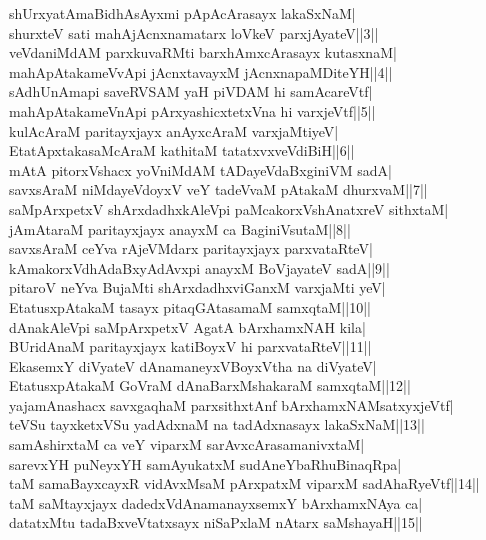 \documentclass{article}
\begin{document}
shUrxyatAmaBidhAsAyxmi pApAcArasayx lakaSxNaM|\\
shurxteV sati mahAjAcnxnamatarx loVkeV parxjAyateV||3||\\
veVdaniMdAM parxkuvaRMti barxhAmxcArasayx kutasxnaM|\\
mahApAtakameVvApi jAcnxtavayxM jAcnxnapaMDiteYH||4||\\
sAdhUnAmapi saveRVSAM yaH piVDAM hi samAcareVtf|\\
mahApAtakameVnApi pArxyashicxtetxVna hi varxjeVtf||5||\\
kulAcAraM paritayxjayx anAyxcAraM varxjaMtiyeV|\\
EtatApxtakasaMcAraM kathitaM tatatxvxveVdiBiH||6||\\
mAtA pitorxVshacx yoVniMdAM tADayeVdaBxginiVM sadA|\\
savxsAraM niMdayeVdoyxV veY tadeVvaM pAtakaM dhurxvaM||7||\\
saMpArxpetxV shArxdadhxkAleVpi paMcakorxVshAnatxreV sithxtaM|\\
jAmAtaraM paritayxjayx anayxM ca BaginiVsutaM||8||\\
savxsAraM ceYva rAjeVMdarx paritayxjayx parxvataRteV|\\
kAmakorxVdhAdaBxyAdAvxpi anayxM BoVjayateV sadA||9||\\
pitaroV neYva BujaMti shArxdadhxviGanxM varxjaMti yeV|\\
EtatusxpAtakaM tasayx pitaqGAtasamaM samxqtaM||10||\\
dAnakAleVpi saMpArxpetxV AgatA bArxhamxNAH kila|\\
BUridAnaM paritayxjayx katiBoyxV hi parxvataRteV||11||\\
EkasemxY diVyateV dAnamaneyxVBoyxVtha na diVyateV|\\
EtatusxpAtakaM GoVraM dAnaBarxMshakaraM samxqtaM||12||\\
yajamAnashacx savxgaqhaM parxsithxtAnf bArxhamxNAMsatxyxjeVtf|\\
teVSu tayxketxVSu yadAdxnaM na tadAdxnasayx lakaSxNaM||13||\\
samAshirxtaM ca veY viparxM sarAvxcArasamanivxtaM|\\
sarevxYH puNeyxYH samAyukatxM sudAneYbaRhuBinaqRpa|\\
taM samaBayxcayxR vidAvxMsaM pArxpatxM viparxM sadAhaRyeVtf||14||\\
taM saMtayxjayx dadedxVdAnamanayxsemxY bArxhamxNAya ca|\\
datatxMtu tadaBxveVtatxsayx niSaPxlaM nAtarx saMshayaH||15||\\
\end{document}
